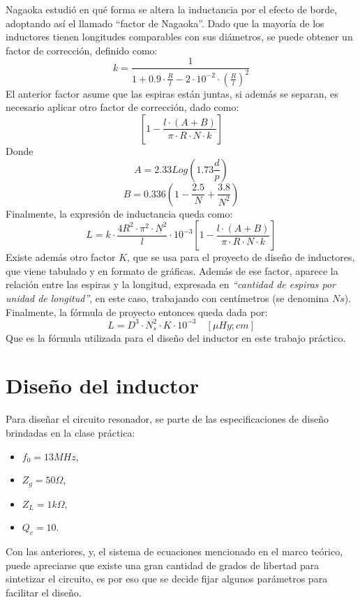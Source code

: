\documentclass{article}
\begin{document}
Nagaoka estudió en qué forma se altera la inductancia por el efecto de borde, adoptando así el llamado “factor de Nagaoka”. Dado que la mayoría de los inductores tienen longitudes comparables con sus diámetros, se puede obtener un factor de corrección, definido como:
\begin{equation*}
    k = \frac{1}{1 + 0.9 \cdot \frac{R}{l} - 2 \cdot 10^{-2} \cdot \left( \frac{R}{l} \right)^2}
\end{equation*}
\noindent El anterior factor asume que las espiras están juntas, si además se separan, es necesario aplicar otro factor de corrección, dado como:
\begin{equation*}
    \left[ 1 - \frac{l \cdot (A+ B)}{\pi \cdot R \cdot N \cdot k} \right]
\end{equation*}
\noindent Donde
\begin{equation*}
    A = 2.33Log\left(1.73 \frac{d}{p}\right)
\end{equation*}
\begin{equation*}
    B = 0.336\left( 1-\frac{2.5}{N}+ \frac{3.8}{N^2} \right)
\end{equation*}
\noindent Finalmente, la expresión de inductancia queda como:
\begin{equation*}
    L = k\cdot \frac{4R^2 \cdot \pi^2 \cdot N^2}{l}\cdot 10^{-3} \left[ 1 - \frac{l \cdot (A+ B)}{\pi \cdot R \cdot N \cdot k} \right]
\end{equation*}
Existe además otro factor $K$, que se usa para el proyecto de diseño de inductores, que viene tabulado y en formato de gráficas. Además de ese factor, aparece la relación entre las espiras y la longitud, expresada en \textit{“cantidad de espiras por unidad de longitud”}, en este caso, trabajando con centímetros (se denomina $Ns$). Finalmente, la fórmula de proyecto entonces queda dada por:
\begin{equation*}
    L = D^3 \cdot N_s^2 \cdot K \cdot 10^{-3} \quad [\mu Hy; cm]
\end{equation*}
\noindent Que es la fórmula utilizada para el diseño del inductor en este trabajo práctico.
\newpage
\section{Diseño del inductor}
Para diseñar el circuito resonador, se parte de las especificaciones de diseño brindadas en la clase práctica:
\begin{itemize}
    \item $f_0 = 13 MHz$,
    \item $Z_g = 50 \Omega$,
    \item $Z_L = 1 k\Omega$,
    \item $Q_c = 10$.
\end{itemize}
\noindent Con las anteriores, y, el sistema de ecuaciones mencionado en el marco teórico, puede apreciarse que existe una gran cantidad de grados de libertad para sintetizar el circuito, es por eso que se decide fijar algunos parámetros para facilitar el diseño.
\end{document}
